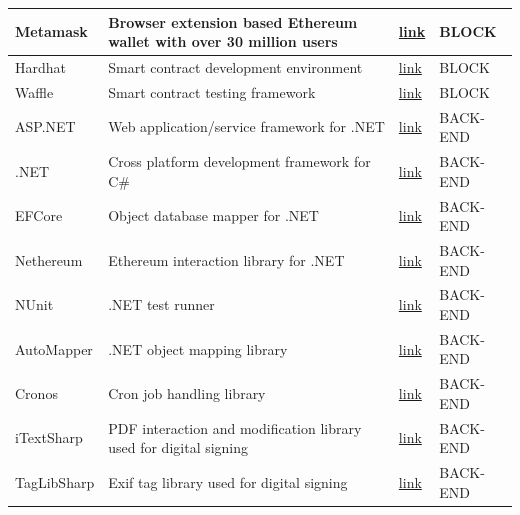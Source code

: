 \begin{table}[H]
\begin{tabular}{|p{}|p{}|p{}|p{}|}
Metamask       & Browser extension based Ethereum wallet with over 30 million users                    & \href{https://metamask.io}{link}                               & BLOCK     \\ \hline
Hardhat        & Smart contract development environment                                                & \href{https://hardhat.org}{link}                               & BLOCK     \\ \hline
Waffle         & Smart contract testing framework                                                      & \href{https://getwaffle.io}{link}                              & BLOCK     \\ \hline
ASP.NET        & Web application/service framework for .NET                                            & \href{https://dotnet.microsoft.com/en-us/apps/aspnet}{link}    & BACK-END  \\ \hline
.NET           & Cross platform development framework for C\#                                          & \href{https://dotnet.microsoft.com/en-us/}{link}               & BACK-END  \\ \hline
EFCore         & Object database mapper for .NET                                                       & \href{https://docs.microsoft.com/en-us/ef/core/}{link}         & BACK-END  \\ \hline
Nethereum      & Ethereum interaction library for .NET                                                 & \href{https://nethereum.com/}{link}                            & BACK-END  \\ \hline
NUnit          & .NET test runner                                                                      & \href{https://nunit.org/}{link}                                & BACK-END  \\ \hline
AutoMapper     & .NET object mapping library                                                           & \href{https://automapper.org/}{link}                           & BACK-END  \\ \hline
Cronos         & Cron job handling library                                                             & \href{https://www.nuget.org/packages/Cronos/}{link}            & BACK-END  \\ \hline
iTextSharp     & PDF interaction and modification library used for digital signing                     & \href{https://www.nuget.org/packages/iTextSharp/}{link}        & BACK-END  \\ \hline
TagLibSharp    & Exif tag library used for digital signing                                             & \href{https://github.com/mono/taglib-sharp}{link}              & BACK-END  \\ \hline

\end{tabular}
\end{table}
